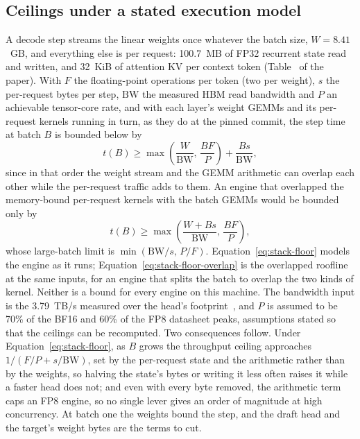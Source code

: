 \subsection{Ceilings under a stated execution model}\label{app:ceilings}\label{sec:stack-ceilings}
A decode step streams the linear weights once whatever the batch size, $W=8.41$~GB, and everything else is per request: 100.7~MB of FP32 recurrent state read and written, and 32~KiB of attention KV per context token (Table~ of the paper). With $F$ the floating-point operations per token (two per weight), $s$ the per-request bytes per step, $\mathrm{BW}$ the measured HBM read bandwidth and $P$ an achievable tensor-core rate, and with each layer's weight GEMMs and its per-request kernels running in turn, as they do at the pinned commit, the step time at batch $B$ is bounded below by
\begin{equation}
t(B)\ge\max\!\left(\frac{W}{\mathrm{BW}},\,\frac{BF}{P}\right)+\frac{Bs}{\mathrm{BW}},\label{eq:stack-floor}
\end{equation}
since in that order the weight stream and the GEMM arithmetic can overlap each other while the per-request traffic adds to them. An engine that overlapped the memory-bound per-request kernels with the batch GEMMs would be bounded only by
\begin{equation}
t(B)\ge\max\!\left(\frac{W+Bs}{\mathrm{BW}},\,\frac{BF}{P}\right),\label{eq:stack-floor-overlap}
\end{equation}
whose large-batch limit is $\min(\mathrm{BW}/s,\,P/F)$. Equation~\eqref{eq:stack-floor} models the engine as it runs; Equation~\eqref{eq:stack-floor-overlap} is the overlapped roofline at the same inputs, for an engine that splits the batch to overlap the two kinds of kernel. Neither is a bound for every engine on this machine. The bandwidth input is the 3.79~TB/s measured over the head's footprint~, and $P$ is assumed to be 70\% of the BF16 and 60\% of the FP8 datasheet peaks, assumptions stated so that the ceilings can be recomputed. Two consequences follow. Under Equation~\eqref{eq:stack-floor}, as $B$ grows the throughput ceiling approaches $1/(F/P+s/\mathrm{BW})$, set by the per-request state and the arithmetic rather than by the weights, so halving the state's bytes or writing it less often raises it while a faster head does not; and even with every byte removed, the arithmetic term caps an FP8 engine, so no single lever gives an order of magnitude at high concurrency. At batch one the weights bound the step, and the draft head and the target's weight bytes are the terms to cut.

